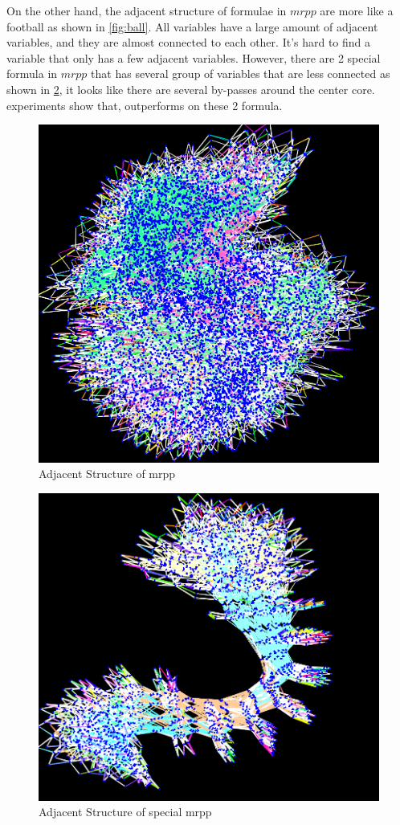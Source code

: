 On the other hand, the adjacent structure of formulae in $\textit{mrpp}$ are more like a football as shown in \ref{fig:ball}. All variables have a large amount of adjacent variables, and they are almost connected to each other. It's hard to find a variable that only has a few adjacent variables. However, there are 2 special formula in $\textit{mrpp}$ that has several group of variables that are less connected as shown in \ref{fig:mrpp_s}, it looks like there are several by-passes around the center core. experiments show that, \tool outperforms \minibones on these 2 formula.
\begin{figure}
\centering \includegraphics[scale=0.3]{ball.png}
\caption{Adjacent Structure of mrpp}\label{fig:mrpp}
\end{figure}
\begin{figure}
\centering \includegraphics[scale=0.3]{mrpp_s.png}
\caption{Adjacent Structure of special mrpp}\label{fig:mrpp_s}
\end{figure}

